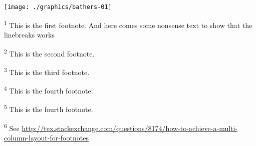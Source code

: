 \begin{sidewaysfigure}
\centering
\texttt{[image: ./graphics/bathers-01]}
\vspace{3\baselineskip}
\footnoterule\footnotesize
\begin{minipage}[t]{0.49\linewidth}
\textsuperscript{1} This is the first footnote. And here comes some nonsense text
                    to show that the linebreaks works \par
\textsuperscript{2} This is the second footnote.\par
\end{minipage}\hfill
\begin{minipage}[t]{0.49\linewidth}
\textsuperscript{3} This is the third footnote. \par
\textsuperscript{4} This is the fourth footnote.\par
\textsuperscript{5} This is the fourth footnote.\par
\textsuperscript{6} See \url{http://tex.stackexchange.com/questions/8174/how-to-achieve-a-multi-column-layout-for-footnotes}\par
\end{minipage}
\end{sidewaysfigure}


